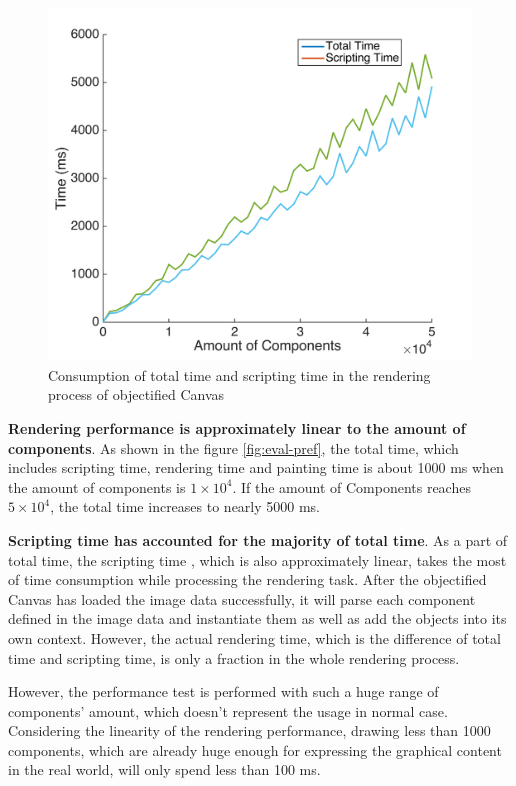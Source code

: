 \begin{figure}[!htbp]
  \centering
    \includegraphics[width=1\textwidth]{Figures/eval-perf.png}
  \caption{Consumption of total time and scripting time in the rendering process of objectified Canvas}
  \label{fig:eval-perf}
\end{figure}


\textbf{Rendering performance is approximately linear to the amount of components}. As shown in the figure \ref{fig:eval-pref}, the total time, which includes scripting time, rendering time and painting time is about 1000 ms when the amount of components is $1\times 10^{4}$. If the amount of Components reaches $5\times 10^{4}$, the total time increases to nearly 5000 ms.

\textbf{Scripting time has accounted for the majority of total time}. As a part of total time, the scripting time , which is also approximately linear, takes the most of time consumption while processing the rendering task. After the objectified Canvas has loaded the image data successfully, it will parse each component defined in the image data and instantiate them as well as add the objects into its own context. However, the actual rendering time, which is the difference of total time and scripting time, is only a fraction in the whole rendering process.

However, the performance test is performed with such a huge range of components' amount, which doesn't represent the usage in normal case. Considering the linearity of the rendering performance, drawing less than 1000 components, which are already huge enough for expressing the graphical content in the real world, will only spend less than 100 ms.